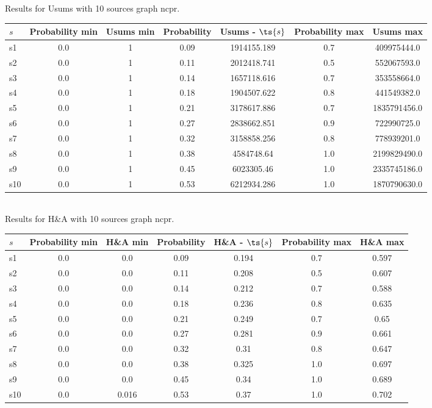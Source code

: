 \documentclass{article}
\begin{document}
\noindent Results for Usums with 10 sources graph ncpr.

\noindent\begin{tabular}{|l|c|c|c|c|c|c|}
\hline
$s$& Probability min & Usums min & Probability & Usums - $\ts{s}$ & Probability max & Usums max\\
\hline
s1 &0.0 & 1 & 0.09 & 1914155.189 & 0.7 & 409975444.0\\
\hline
s2 &0.0 & 1 & 0.11 & 2012418.741 & 0.5 & 552067593.0\\
\hline
s3 &0.0 & 1 & 0.14 & 1657118.616 & 0.7 & 353558664.0\\
\hline
s4 &0.0 & 1 & 0.18 & 1904507.622 & 0.8 & 441549382.0\\
\hline
s5 &0.0 & 1 & 0.21 & 3178617.886 & 0.7 & 1835791456.0\\
\hline
s6 &0.0 & 1 & 0.27 & 2838662.851 & 0.9 & 722990725.0\\
\hline
s7 &0.0 & 1 & 0.32 & 3158858.256 & 0.8 & 778939201.0\\
\hline
s8 &0.0 & 1 & 0.38 & 4584748.64 & 1.0 & 2199829490.0\\
\hline
s9 &0.0 & 1 & 0.45 & 6023305.46 & 1.0 & 2335745186.0\\
\hline
s10 &0.0 & 1 & 0.53 & 6212934.286 & 1.0 & 1870790630.0\\
\hline
\end{tabular}\\

\noindent Results for H\&A with 10 sources graph ncpr.

\noindent\begin{tabular}{|l|c|c|c|c|c|c|}
\hline
$s$& Probability min & H\&A min & Probability & H\&A - $\ts{s}$ & Probability max & H\&A max\\
\hline
s1 &0.0 & 0.0 & 0.09 & 0.194 & 0.7 & 0.597\\
\hline
s2 &0.0 & 0.0 & 0.11 & 0.208 & 0.5 & 0.607\\
\hline
s3 &0.0 & 0.0 & 0.14 & 0.212 & 0.7 & 0.588\\
\hline
s4 &0.0 & 0.0 & 0.18 & 0.236 & 0.8 & 0.635\\
\hline
s5 &0.0 & 0.0 & 0.21 & 0.249 & 0.7 & 0.65\\
\hline
s6 &0.0 & 0.0 & 0.27 & 0.281 & 0.9 & 0.661\\
\hline
s7 &0.0 & 0.0 & 0.32 & 0.31 & 0.8 & 0.647\\
\hline
s8 &0.0 & 0.0 & 0.38 & 0.325 & 1.0 & 0.697\\
\hline
s9 &0.0 & 0.0 & 0.45 & 0.34 & 1.0 & 0.689\\
\hline
s10 &0.0 & 0.016 & 0.53 & 0.37 & 1.0 & 0.702\\
\hline
\end{tabular}\\
\end{document}

